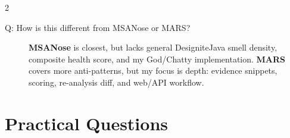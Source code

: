 \documentclass[10pt,a4paper]{article}
\begin{document}
\begin{multicols}{2}
\begin{description}

    \item[Q: How is this different from MSANose or MARS?]
    \textbf{MSANose} is closest, but lacks general DesigniteJava smell density, composite health score, and my God/Chatty implementation. \textbf{MARS} covers more anti-patterns, but my focus is depth: evidence snippets, scoring, re-analysis diff, and web/API workflow.

\end{description}

\section{Practical Questions}

\begin{description}




\end{description}
\end{multicols}
\end{document}
